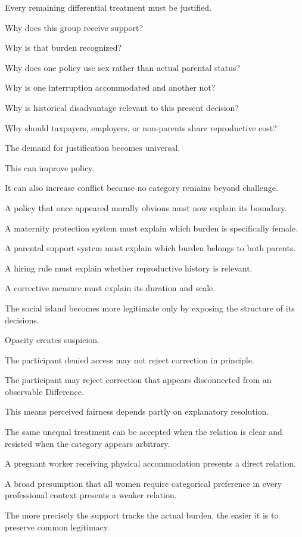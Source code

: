 Every remaining differential treatment must be justified.

Why does this group receive support?

Why is that burden recognized?

Why does one policy use sex rather than actual parental status?

Why is one interruption accommodated and another not?

Why is historical disadvantage relevant to this present decision?

Why should taxpayers, employers, or non-parents share reproductive cost?

The demand for justification becomes universal.

This can improve policy.

It can also increase conflict because no category remains beyond challenge.

A policy that once appeared morally obvious must now explain its boundary.

A maternity protection system must explain which burden is specifically female.

A parental support system must explain which burden belongs to both parents.

A hiring rule must explain whether reproductive history is relevant.

A corrective measure must explain its duration and scale.

The social island becomes more legitimate only by exposing the structure of its decisions.

Opacity creates suspicion.

The participant denied access may not reject correction in principle.

The participant may reject correction that appears disconnected from an observable Difference.

This means perceived fairness depends partly on explanatory resolution.

The same unequal treatment can be accepted when the relation is clear and resisted when the category appears arbitrary.

A pregnant worker receiving physical accommodation presents a direct relation.

A broad presumption that all women require categorical preference in every professional context presents a weaker relation.

The more precisely the support tracks the actual burden, the easier it is to preserve common legitimacy.

